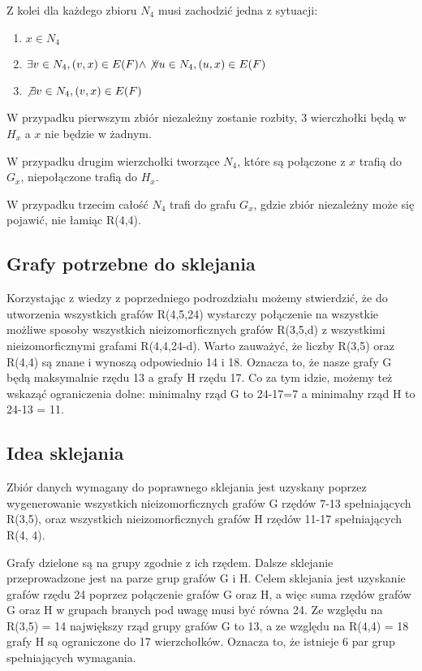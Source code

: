   Z kolei dla każdego zbioru $N_4$ musi zachodzić jedna z sytuacji:
  \begin{enumerate}
    \item $x \in N_4$
    \item $ \exists v \in N_4, (v, x) \in E(F) \land \not \forall u \in N_4, (u,x) \in E(F)$ 
    \item $\not \exists v \in N_4, (v, x) \in E(F)$
  \end{enumerate} 

  W przypadku pierwszym zbiór niezależny zostanie rozbity, 3 wierczhołki będą w $H_x$ a $x$ nie będzie w żadnym.
  
  W przypadku drugim wierzchołki tworzące $N_4$, które są połączone z $x$ trafią do $G_x$, niepołączone trafią do $H_x$.
  
  W przypadku trzecim całość $N_4$ trafi do grafu $G_x$, gdzie zbiór niezależny może się pojawić, nie łamiąc R(4,4).

\subsection{Grafy potrzebne do sklejania}

Korzystając z wiedzy z poprzedniego podrozdziału możemy stwierdzić, że do utworzenia wszystkich grafów R(4,5,24) wystarczy połączenie na wszystkie możliwe sposoby
wszystkich nieizomorficznych grafów R(3,5,d) z wszystkimi nieizomorficznymi grafami R(4,4,24-d). 
Warto zauważyć, że liczby R(3,5) oraz R(4,4) są znane i wynoszą odpowiednio 14 i 18. Oznacza to, że nasze grafy G będą maksymalnie rzędu 13 a grafy H rzędu 17. Co za tym idzie, możemy też wskaząć ograniczenia dolne:
minimalny rząd G to 24-17=7 a minimalny rząd H to 24-13 = 11.  

\subsection{Idea sklejania}
Zbiór danych wymagany do poprawnego sklejania jest uzyskany poprzez wygenerowanie wszystkich nieizomorficznych grafów G rzędów 7-13 spełniających R(3,5), oraz wszystkich nieizomorficznych grafów H rzędów 11-17 spełniających R(4, 4).

Grafy dzielone są na grupy zgodnie z ich rzędem. Dalsze sklejanie przeprowadzone jest na parze grup grafów G i H. Celem sklejania jest uzyskanie grafów rzędu 24 poprzez połączenie grafów G oraz H, a więc suma rzędów grafów G oraz H w grupach branych pod uwagę musi być równa 24. Ze względu na R(3,5) = 14 największy rząd grupy grafów G to 13, a ze względu na R(4,4) = 18 grafy H są ograniczone do 17 wierzchołków. Oznacza to, że istnieje 6 par grup spełniających wymagania.

